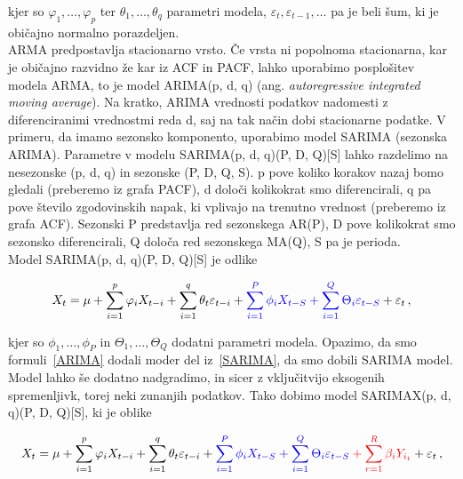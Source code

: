 \documentclass[a4paper, 11pt]{article}
\begin{document}
\noindent kjer so $\varphi_1, \dots, \varphi_p$ ter $\theta_1, \dots, \theta_q$ parametri
modela, $\varepsilon_t, \varepsilon_{t-1}, \dots$ pa je beli šum, ki je običajno
normalno porazdeljen. \\

\noindent ARMA predpostavlja stacionarno vrsto. Če vrsta ni popolnoma stacionarna, kar je običajno razvidno 
že kar iz ACF in PACF, lahko uporabimo posplošitev modela ARMA, to je model ARIMA(p, d, q) (ang. \emph{autoregressive integrated moving average}).
Na kratko, ARIMA vrednosti podatkov nadomesti z diferenciranimi vrednostmi reda d, saj na tak način dobi stacionarne podatke.
V primeru, da imamo sezonsko komponento, uporabimo model SARIMA (sezonska ARIMA). Parametre v modelu
SARIMA(p, d, q)(P, D, Q)[S] lahko razdelimo na nesezonske (p, d, q) in sezonske (P, D, Q, S). 
p pove koliko korakov nazaj bomo gledali (preberemo iz grafa PACF), 
d določi kolikokrat smo diferencirali,
q pa pove število zgodovinskih napak, ki vplivajo na trenutno vrednost (preberemo iz grafa ACF).
Sezonski P predstavlja red sezonskega AR(P), 
D pove kolikokrat smo sezonsko diferencirali,
Q določa red sezonskega MA(Q), 
S pa je perioda. \cite{SARIMA_param} \\

\noindent Model SARIMA(p, d, q)(P, D, Q)[S] je odlike

\begin{equation}
    \label{SARIMA}
    X_t = \mu + \sum_{i=1}^{p}{\varphi_i X_{t-i}} + \sum_{i=1}^{q}{\theta_t \varepsilon_{t-i}} + \color{blue} \sum_{i=1}^{P}{\phi_i X_{t-S}} + \sum_{i=1}^{Q}{\Theta_i \varepsilon_{t-S}}  \color{black} +  \varepsilon_t\,,
\end{equation}

\noindent kjer so $\phi_1, \dots, \phi_P$ in $\Theta_1, \dots, \Theta_Q$ dodatni parametri modela. Opazimo, da 
smo formuli~\eqref{ARIMA} dodali moder del iz~\eqref{SARIMA}, da smo dobili SARIMA model. \\

\noindent Model lahko še dodatno nadgradimo, in sicer z vključitvijo eksogenih spremenljivk, torej neki zunanjih podatkov. Tako
dobimo model SARIMAX(p, d, q)(P, D, Q)[S], ki je oblike

\begin{equation}
    \label{SARIMAX}
    X_t = \mu + \sum_{i=1}^{p}{\varphi_i X_{t-i}} + \sum_{i=1}^{q}{\theta_t \varepsilon_{t-i}} + \color{blue} \sum_{i=1}^{P}{\phi_i X_{t-S}} + \sum_{i=1}^{Q}{\Theta_i \varepsilon_{t-S}}  \color{red}  + \sum_{r=1}^{R}{\beta_i Y_{i_{t}}} \color{black} +  \varepsilon_t\,,
\end{equation}
\end{document}

